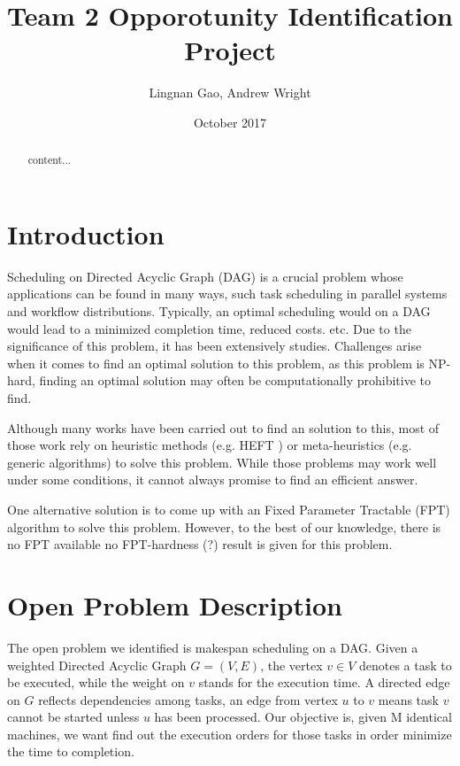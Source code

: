 \documentclass{article}
\title{Team 2 Opporotunity Identification Project}
\author{Lingnan Gao, Andrew Wright}
\date{October 2017}
\begin{document}
\maketitle
\begin{abstract}
	content...
\end{abstract}
\newcommand{\defproblem}[4]{%
  \hfill\\\smallskip\noindent%
  \begin{tabularx}{\textwidth}{|l X|}%
    \hline%
    \multicolumn{2}{|l|}{{#1}}\\%
    \textbf{Input:}&#2\\%
    \textbf{Question:}&#4\smallskip\\\hline%
  \end{tabularx}%
  \smallskip%
}%
\section{Introduction}
Scheduling on Directed Acyclic Graph (DAG) is a crucial problem whose 
applications can be found in many ways, such task scheduling in parallel 
systems and workflow distributions. Typically, an optimal scheduling 
would on a DAG would lead to a minimized completion time,
reduced costs. etc. Due to the significance of this problem, it has been 
extensively studies. Challenges arise when it comes to find an optimal solution 
to this problem, as this problem is NP-hard, finding an optimal solution may 
often be computationally prohibitive to find. 

Although many works have been carried out to find an solution to this, most 
of those work rely on heuristic methods (e.g. HEFT \cite{topcuoglu2002performance}) or 
meta-heuristics (e.g. generic algorithms) to solve this problem. 
While those problems may work well under some conditions, 
it cannot always promise to find an efficient answer.  

One alternative solution is to come up with an Fixed Parameter Tractable 
(FPT)
algorithm to solve this problem. However, to the best of our knowledge,
there is no FPT available 
no FPT-hardness (?) result is given for this problem.

\section{Open Problem Description}
The open problem we identified is makespan scheduling on a DAG.
Given a weighted Directed Acyclic Graph $G=(V,E)$, the vertex
$v \in V$ denotes a task to be executed, while the weight on $v$ 
stands for the execution time. A directed edge on $G$ reflects
dependencies among tasks, an edge from vertex $u$ to $v$
means task $v$ cannot be started unless $u$ has been processed. 
Our objective is, given M identical machines, we want find out the execution
orders for those tasks in order minimize the time to completion.
\end{document}
